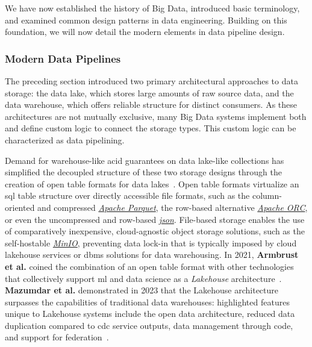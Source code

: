 We have now established the history of Big Data, introduced basic terminology, and examined common design patterns in data engineering.
Building on this foundation, we will now detail the modern elements in data pipeline design.


\subsubsection{Modern Data Pipelines}
\label{sec:related-work-big-data-pipelines}

The preceding section introduced two primary architectural approaches to data storage: the data lake, which stores large amounts of raw source data, and the data warehouse, which offers reliable structure for distinct consumers.
As these architectures are not mutually exclusive, many Big Data systems implement both and define custom logic to connect the storage types.
This custom logic can be characterized as data pipelining.

Demand for warehouse-like \ac{acid} guarantees on data lake-like collections has simplified the decoupled structure of these two storage designs through the creation of open table formats for data lakes~\cite{Woodie2021}.
Open table formats virtualize an \ac{sql} table structure over directly accessible file formats, such as the column-oriented and compressed \href{https://parquet.apache.org/}{\textit{Apache Parquet}}, the row-based alternative \href{https://orc.apache.org/}{\textit{Apache ORC}}, or even the uncompressed and row-based \href{https://datatracker.ietf.org/doc/html/rfc8259}{\textit{\ac{json}}}.
File-based storage enables the use of comparatively inexpensive, cloud-agnostic object storage solutions, such as the self-hostable \href{https://min.io/}{\textit{MinIO}}, preventing data lock-in that is typically imposed by cloud lakehouse services or \ac{dbms} solutions for data warehousing.
In 2021, \textbf{Armbrust et al.} coined the combination of an open table format with other technologies that collectively support \ac{ml} and data science as a \textit{Lakehouse} architecture~\cite{Armbrust2021}.
\textbf{Mazumdar et al.} demonstrated in 2023 that the Lakehouse architecture surpasses the capabilities of traditional data warehouses: highlighted features unique to Lakehouse systems include the open data architecture, reduced data duplication compared to \ac{cdc} service outputs, data management through code, and support for federation~\cite{Mazumdar2023}.

